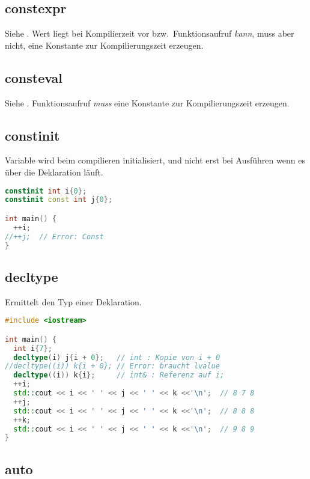 \documentclass[10pt,twocolumn]{scrartcl}
\begin{document}
\subsection{constexpr}

Siehe . Wert liegt bei Kompilierzeit vor bzw.\
Funktionsaufruf \emph{kann}, muss aber nicht, eine Konstante zur
Kompilierungszeit erzeugen.

\subsection{consteval}

Siehe . Funktionsaufruf \emph{muss} eine Konstante zur Kompilierungszeit erzeugen.

\subsection{constinit}

Variable wird beim compilieren initialisiert, und nicht erst bei Ausführen wenn
es über die Deklaration läuft.

\begin{lstlisting}[language=C++]
constinit int i{0};
constinit const int j{0};

int main() {
  ++i;
//++j;  // Error: Const
}
\end{lstlisting}

\subsection{decltype}

Ermittelt den Typ einer Deklaration.

\begin{lstlisting}[language=C++]
#include <iostream>

int main() {
  int i{7};
  decltype(i) j{i + 0};   // int : Kopie von i + 0
//decltype((i)) k{i + 0}; // Error: braucht lvalue
  decltype((i)) k{i};     // int& : Referenz auf i;
  ++i;
  std::cout << i << ' ' << j << ' ' << k <<'\n';  // 8 7 8
  ++j;
  std::cout << i << ' ' << j << ' ' << k <<'\n';  // 8 8 8
  ++k;
  std::cout << i << ' ' << j << ' ' << k <<'\n';  // 9 8 9
}
\end{lstlisting}

\subsection{auto}
\end{document}
